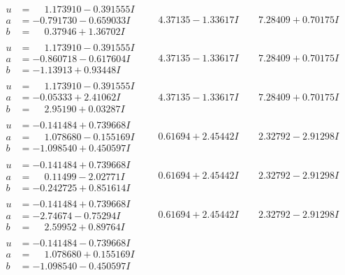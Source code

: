 \documentclass[1p]{elsarticle_modified}
\theoremstyle{definition}
\begin{document}
$$\begin{array}{c|c|c}
\begin{aligned}
u &= \phantom{-}1.173910 - 0.391555 I \\
a &= -0.791730 - 0.659033 I \\
b &= \phantom{-}0.37946 + 1.36702 I\end{aligned}
 & \phantom{-}4.37135 - 1.33617 I & \phantom{-}7.28409 + 0.70175 I \\ \hline\begin{aligned}
u &= \phantom{-}1.173910 - 0.391555 I \\
a &= -0.860718 - 0.617604 I \\
b &= -1.13913 + 0.93448 I\end{aligned}
 & \phantom{-}4.37135 - 1.33617 I & \phantom{-}7.28409 + 0.70175 I \\ \hline\begin{aligned}
u &= \phantom{-}1.173910 - 0.391555 I \\
a &= -0.05333 + 2.41062 I \\
b &= \phantom{-}2.95190 + 0.03287 I\end{aligned}
 & \phantom{-}4.37135 - 1.33617 I & \phantom{-}7.28409 + 0.70175 I \\ \hline\begin{aligned}
u &= -0.141484 + 0.739668 I \\
a &= \phantom{-}1.078680 - 0.155169 I \\
b &= -1.098540 + 0.450597 I\end{aligned}
 & \phantom{-}0.61694 + 2.45442 I & \phantom{-}2.32792 - 2.91298 I \\ \hline\begin{aligned}
u &= -0.141484 + 0.739668 I \\
a &= \phantom{-}0.11499 - 2.02771 I \\
b &= -0.242725 + 0.851614 I\end{aligned}
 & \phantom{-}0.61694 + 2.45442 I & \phantom{-}2.32792 - 2.91298 I \\ \hline\begin{aligned}
u &= -0.141484 + 0.739668 I \\
a &= -2.74674 - 0.75294 I \\
b &= \phantom{-}2.59952 + 0.89764 I\end{aligned}
 & \phantom{-}0.61694 + 2.45442 I & \phantom{-}2.32792 - 2.91298 I \\ \hline\begin{aligned}
u &= -0.141484 - 0.739668 I \\
a &= \phantom{-}1.078680 + 0.155169 I \\
b &= -1.098540 - 0.450597 I\end{aligned}

\end{array}$$
\end{document}

